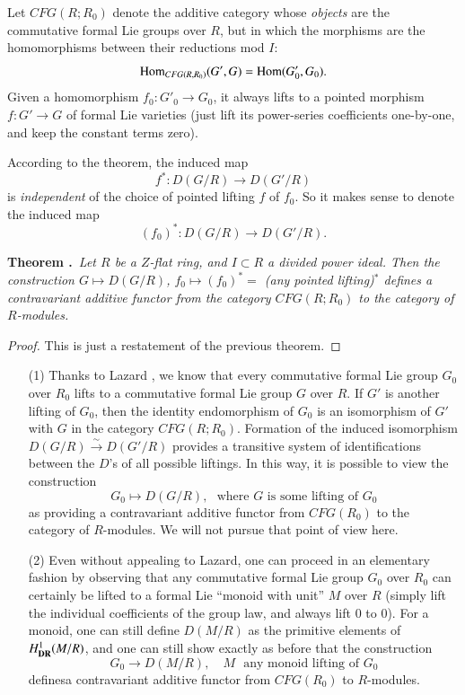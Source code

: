Let $CFG(R;R_{0})$ denote the additive category whose {\em objects} are the commutative formal Lie groups over $R$, but in which the morphisms are the homomorphisms between their reductions mod $I$:
$$
\operatorname{Hom}_{CFG(R,R_{0})}(G',G)=\operatorname{Hom}(G'_{0},G_{0}).
$$
Given a homomorphism $f_{0}:G'_{0}\to G_{0}$, it always lifts to a pointed morphism\pageoriginale $f:G'\to G$ of formal Lie varieties (just lift its power-series coefficients one-by-one, and keep the constant terms zero).

According to the theorem, the induced map
$$
f^{*}:D(G/R)\to D(G'/R)
$$
is {\em independent} of the choice of pointed lifting $f$ of $f_{0}$. So it makes sense to denote the induced map
$$
(f_{0})^{*}:D(G/R)\to D(G'/R).
$$

\medskip
\noindent
{\bf Theorem .\label{art6-thm5.1.5}}~{\em Let $R$ be a $Z$-flat ring, and $I\subset R$ a divided power ideal. Then the construction $G\mapsto D(G/R)$, $f_{0}\mapsto (f_{0})^{*}=$ (any pointed lifting)$^{*}$ defines a contravariant additive functor from the category $CFG(R;R_{0})$ to the category of $R$-modules.}
\smallskip

\begin{proof}
This is just a restatement of the previous theorem.
\end{proof}

\begin{remarks*}
\begin{itemize}
\item[(1)] Thanks to Lazard \cite{art6-key33}, we know that every commutative formal Lie group $G_{0}$ over $R_{0}$ lifts to a commutative formal Lie group $G$ over $R$. If $G'$ is another lifting of $G_{0}$, then the identity endomorphism of $G_{0}$ is an isomorphism of $G'$ with $G$ in the category $CFG(R;R_{0})$. Formation of the induced isomorphism $D(G/R)\xrightarrow{\sim}D(G'/R)$ provides a transitive system of identifications between the $D$'s of all possible liftings. In this way, it is possible to view the construction
$$
G_{0}\mapsto D(G/R),\text{~ where $G$ is some lifting of $G_{0}$}
$$
as providing a contravariant additive functor from $CFG(R_{0})$ to the category of $R$-modules. We will not pursue that point of view here.

\item[(2)] Even without appealing to Lazard, one can proceed in an elementary fashion by observing that any commutative formal Lie group $G_{0}$ over $R_{0}$ can certainly be lifted to a formal Lie ``monoid with unit'' $M$ over $R$ (simply lift the individual coefficients of the group law, and always lift $0$ to $0$). For a monoid, one can still define $D(M/R)$ as the primitive elements of $H^{1}_{\mathbf{DR}}(M/R)$, and one can still show exactly as before that the construction
$$
G_{0}\to D(M/R),\quad M\text{~ any monoid lifting of $G_{0}$}
$$
defines\pageoriginale a contravariant additive functor from $CFG(R_{0})$ to $R$-modu\-les.
\end{itemize}
\end{remarks*}

